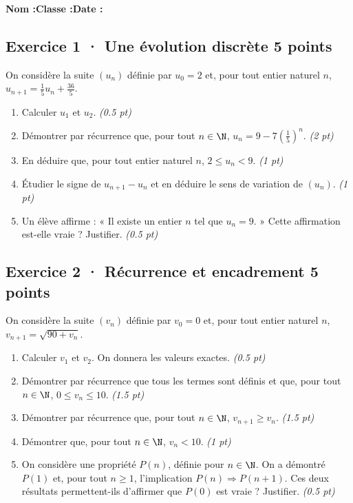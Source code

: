 \smallskip\textbf{Nom :}\enspace\dotfill\quad\textbf{Classe :}\enspace\dotfill\quad\textbf{Date :}\enspace\dotfill

\subsection*{Exercice 1 · Une évolution discrète \hfill 5 points}On considère la suite $(u_n)$ définie par $u_0=2$ et, pour tout entier naturel $n$, $u_{n+1}=\frac{1}{5}u_n+\frac{36}{5}$.

\begin{enumerate}

\item Calculer $u_1$ et $u_2$. \hfill\textit{(\num{0,5} pt)}

\item Démontrer par récurrence que, pour tout $n\in\N$, $u_n=9-7\left(\frac{1}{5}\right)^n$. \hfill\textit{(2 pt)}

\item En déduire que, pour tout entier naturel $n$, $2\le u_n<9$. \hfill\textit{(1 pt)}

\item Étudier le signe de $u_{n+1}-u_n$ et en déduire le sens de variation de $(u_n)$. \hfill\textit{(1 pt)}

\item Un élève affirme : « Il existe un entier $n$ tel que $u_n=9$. » Cette affirmation est-elle vraie ? Justifier. \hfill\textit{(\num{0,5} pt)}

\end{enumerate}

\subsection*{Exercice 2 · Récurrence et encadrement \hfill 5 points}On considère la suite $(v_n)$ définie par $v_0=0$ et, pour tout entier naturel $n$, $v_{n+1}=\sqrt{90+v_n}$.

\begin{enumerate}

\item Calculer $v_1$ et $v_2$. On donnera les valeurs exactes. \hfill\textit{(\num{0,5} pt)}

\item Démontrer par récurrence que tous les termes sont définis et que, pour tout $n\in\N$, $0\le v_n\le10$. \hfill\textit{(\num{1,5} pt)}

\item Démontrer par récurrence que, pour tout $n\in\N$, $v_{n+1}\ge v_n$. \hfill\textit{(\num{1,5} pt)}

\item Démontrer que, pour tout $n\in\N$, $v_n<10$. \hfill\textit{(1 pt)}

\item On considère une propriété $P(n)$, définie pour $n\in\N$. On a démontré $P(1)$ et, pour tout $n\ge1$, l'implication $P(n)\Rightarrow P(n+1)$. Ces deux résultats permettent-ils d'affirmer que $P(0)$ est vraie ? Justifier. \hfill\textit{(\num{0,5} pt)}

\end{enumerate}

